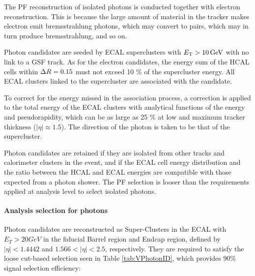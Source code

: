 The PF reconstruction of isolated photons is conducted together with electron reconstruction.
This is because the large amount of material in the tracker makes electron emit bremsstrahlung photons, which may convert to \Pep \Pem pairs,
which may in turn produce bremsstrahlung, and so on.

Photon candidates are seeded by ECAL superclusters with $E_{\mathrm{T}} > 10 \,\text{Ge\hspace{-.08em}V}$ with no link to a GSF track.
As for the electron candidates, the energy sum of the HCAL cells within $\Delta R = 0.15$ must not exceed 10 \% of the supercluster energy.
All ECAL clusters linked to the supercluster are associated with the candidate.

To correct for the energy missed in the association process,
a correction is applied to the total energy of the ECAL clusters with analytical functions of the energy and pseudorapidity, which can be as large as 25 \% at low \pt and maximum tracker thickness ($|\eta| \approx 1.5$).
The direction of the photon is taken to be that of the supercluster.

Photon candidates are retained if they are isolated from other tracks and calorimeter clusters in the event,
and if the ECAL cell energy distribution and the ratio between the HCAL and ECAL energies are compatible with those expected from a photon shower.
The PF selection is looser than the requirements applied at analysis level to select isolated photons.

\paragraph{Analysis selection for photons}
Photon candidates are reconstructed as Super-Clusters in the ECAL with $E_{T} > 20 GeV$ in the fiducial Barrel region and Endcap region, defined by $|\eta|<1.4442$ and $1.566<|\eta|<2.5$, respectively.
They are required to satisfy the loose cut-based selection \cite{CMS:EGM-17-001} seen in Table \ref{tab:VPhotonID}, which provides $90\%$ signal selection efficiency:

